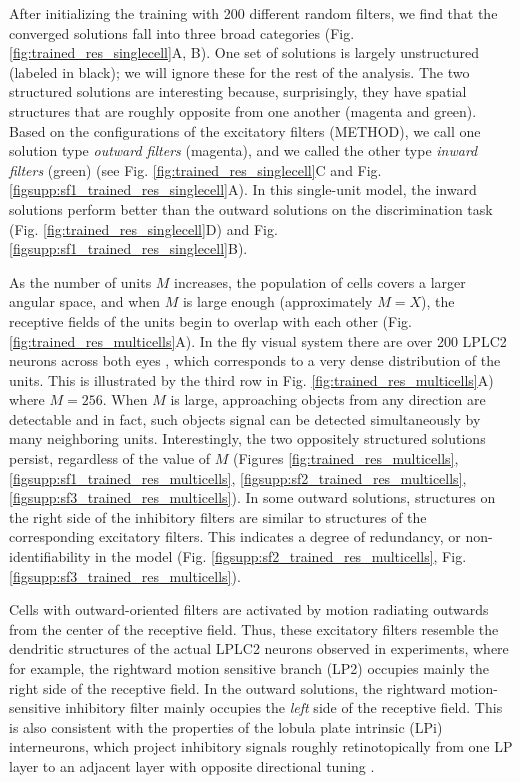 \documentclass[pdftex,9pt,lineno]{elife}
\begin{document}
After initializing the training with 200 different random filters, we find that the converged solutions fall into three broad categories (Fig. \ref{fig:trained_res_singlecell}A, B). One set of solutions is largely unstructured (labeled in black); we will ignore these for the rest of the analysis. The two structured solutions are interesting because, surprisingly, they have  spatial structures that are roughly opposite from one another (magenta and green). Based on the configurations of the excitatory filters (METHOD), we call one solution type \textit{outward filters}   (magenta), and we called the other type \textit{inward filters} (green) (see Fig. \ref{fig:trained_res_singlecell}C and Fig. \ref{figsupp:sf1_trained_res_singlecell}A). In this single-unit model, the inward solutions perform better than the outward solutions on the discrimination task (Fig. \ref{fig:trained_res_singlecell}D) and Fig. \ref{figsupp:sf1_trained_res_singlecell}B).

As the number of units $M$ increases, the population of cells covers a larger angular space, and when $M$ is large enough (approximately $M=X$), the receptive fields of the units begin to overlap with each other (Fig. \ref{fig:trained_res_multicells}A). In the fly visual system there are over 200 LPLC2 neurons across both eyes \citep{ache2019neural}, which corresponds to a very dense distribution of the units. This is illustrated by the third row in Fig. \ref{fig:trained_res_multicells}A) where $M=256$. When $M$ is large, approaching objects from any direction are detectable and in fact, such objects signal can be detected simultaneously by many neighboring units. Interestingly, the two oppositely structured solutions persist, regardless of the value of $M$ (Figures \ref{fig:trained_res_multicells},  \ref{figsupp:sf1_trained_res_multicells}, \ref{figsupp:sf2_trained_res_multicells},  \ref{figsupp:sf3_trained_res_multicells}). In some outward solutions, structures on the right side of the inhibitory filters are similar to structures of the corresponding excitatory filters. This indicates a degree of redundancy, or non-identifiability in the model (Fig. \ref{figsupp:sf2_trained_res_multicells}, Fig. \ref{figsupp:sf3_trained_res_multicells}).

Cells with outward-oriented filters are activated by motion radiating outwards from the center of the receptive field. Thus, these excitatory filters resemble the dendritic structures of the actual LPLC2 neurons observed in experiments, where for example, the rightward motion sensitive branch (LP2) occupies mainly the right side of the receptive field. In the outward solutions, the rightward motion-sensitive inhibitory filter mainly occupies the \textit{left} side of the receptive field. This is also consistent with the properties of the lobula plate intrinsic (LPi) interneurons, which project inhibitory signals roughly retinotopically from one LP layer to an adjacent layer with opposite directional tuning \citep{mauss2015neural,klapoetke2017ultra}.
\end{document}
